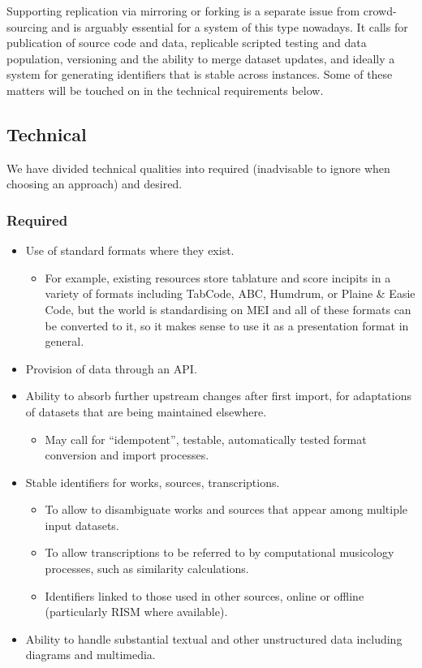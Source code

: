 \documentclass[sigconf, nonacm=true]{acmart}
\begin{document}
\begin{sloppypar}
  Supporting replication via mirroring or forking is a separate issue
  from crowd-sourcing and is arguably essential for a system of this
  type nowadays. It calls for publication of source code and data,
  replicable scripted testing and data population, versioning and the
  ability to merge dataset updates, and ideally a system for
  generating identifiers that is stable across instances. Some of
  these matters will be touched on in the technical requirements
  below.
  
  \subsection{Technical}

  We have divided technical qualities into required (inadvisable to
  ignore when choosing an approach) and desired.
  
  \subsubsection{Required}
  
  \begin{itemize}
  \item Use of standard formats where they exist.
    \begin{itemize}
      \item For example, existing resources store tablature and score
        incipits in a variety of formats including TabCode, ABC,
        Humdrum, or Plaine \& Easie Code, but the world is
        standardising on MEI and all of these formats can be converted
        to it, so it makes sense to use it as a presentation format in
        general.
    \end{itemize}        
  \item Provision of data through an API.
  \item Ability to absorb further upstream changes after first import,
    for adaptations of datasets that are being maintained elsewhere.
    \begin{itemize}
    \item May call for ``idempotent'', testable, automatically tested
      format conversion and import processes.
    \end{itemize}
  \item Stable identifiers for works, sources, transcriptions.
    \begin{itemize}
    \item To allow to disambiguate works and sources that appear among
      multiple input datasets.
    \item To allow transcriptions to be referred to by computational
      musicology processes, such as similarity calculations.
    \item Identifiers linked to those used in other sources, online or
      offline (particularly RISM where available).
    \end{itemize}
  \item Ability to handle substantial textual and other unstructured
    data including diagrams and multimedia.
  \end{itemize}


\end{sloppypar}
\end{document}
